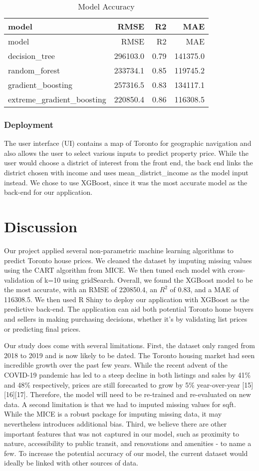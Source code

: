\documentclass[11pt,]{article}
\begin{document}
\begin{longtable}[]{@{}lrrr@{}}
\caption{Model Accuracy}\tabularnewline
\toprule
model & RMSE & R2 & MAE\tabularnewline
\midrule
\endfirsthead
\toprule
model & RMSE & R2 & MAE\tabularnewline
\midrule
\endhead
decision\_tree & 296103.0 & 0.79 & 141375.0\tabularnewline
random\_forest & 233734.1 & 0.85 & 119745.2\tabularnewline
gradient\_boosting & 257316.5 & 0.83 & 134117.1\tabularnewline
extreme\_gradient\_boosting & 220850.4 & 0.86 & 116308.5\tabularnewline
\bottomrule
\end{longtable}

\hypertarget{deployment-1}{%
\subsubsection{Deployment}\label{deployment-1}}

The user interface (UI) contains a map of Toronto for geographic
navigation and also allows the user to select various inputs to predict
property price. While the user would choose a district of interest from
the front end, the back end links the district chosen with income and
uses mean\_district\_income as the model input instead. We chose to use
XGBoost, since it was the most accurate model as the back-end for our
application.

\hypertarget{discussion}{%
\section{Discussion}\label{discussion}}

Our project applied several non-parametric machine learning algorithms
to predict Toronto house prices. We cleaned the dataset by imputing
missing values using the CART algorithm from MICE. We then tuned each
model with cross-validation of k=10 using gridSearch. Overall, we found
the XGBoost model to be the most accurate, with an RMSE of 220850.4, an
\(R^2\) of 0.83, and a MAE of 116308.5. We then used R Shiny to deploy
our application with XGBoost as the predictive back-end. The application
can aid both potential Toronto home buyers and sellers in making
purchasing decisions, whether it's by validating list prices or
predicting final prices.

Our study does come with several limitations. First, the dataset only
ranged from 2018 to 2019 and is now likely to be dated. The Toronto
housing market had seen incredible growth over the past few years. While
the recent advent of the COVID-19 pandemic has led to a steep decline in
both listings and sales by 41\% and 48\% respectively, prices are still
forecasted to grow by 5\% year-over-year {[}15{]}{[}16{]}{[}17{]}.
Therefore, the model will need to be re-trained and re-evaluated on new
data. A second limitation is that we had to imputed missing values for
sqft. While the MICE is a robust package for imputing missing data, it
may nevertheless introduces additional bias. Third, we believe there are
other important features that was not captured in our model, such as
proximity to nature, accessibility to public transit, and renovations
and amenities - to name a few. To increase the potential accuracy of our
model, the current dataset would ideally be linked with other sources of
data.
\end{document}
